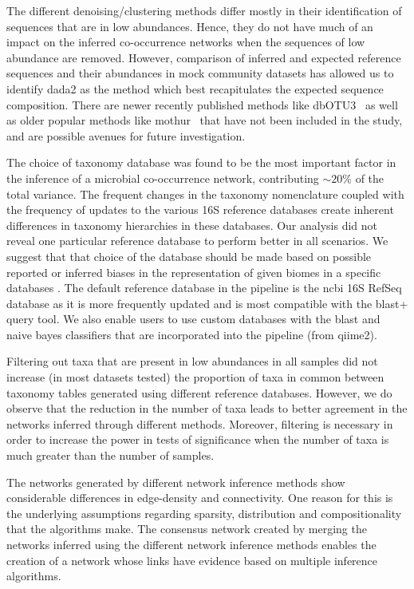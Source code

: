 The different denoising/clustering methods differ mostly in their identification of sequences that are in low abundances.
Hence, they do not have much of an impact on the inferred co-occurrence networks when the sequences of low abundance are removed.
However, comparison of inferred and expected reference sequences and their abundances in mock community datasets has allowed us to identify \ac{dada2} as the method which best recapitulates the expected sequence composition.
There are newer recently published methods like dbOTU3~\cite{Olesen2017} as well as older popular methods like mothur~\cite{Schloss2009} that have not been included in the study, and are possible avenues for future investigation.

The choice of taxonomy database was found to be the most important factor in the inference of a microbial co-occurrence network, contributing $\sim20\%$ of the total variance.
The frequent changes in the taxonomy nomenclature coupled with the frequency of updates to the various 16S reference databases create inherent differences \cite{Balvociute2017} in taxonomy hierarchies in these databases.
Our analysis did not reveal one particular reference database to perform better in all scenarios. We suggest that that choice of the database should be made based on possible reported or inferred biases in the representation of given biomes in a specific databases \cite{Balvociute2017}.
The default reference database in the pipeline is the \ac{ncbi} 16S RefSeq database as it is more frequently updated and is most compatible with the blast+ query tool.
We also enable users to use custom databases \cite{Griffen2011,Ritari2015} with the blast and naive bayes classifiers that are incorporated into the pipeline (from \ac{qiime2}).

Filtering out taxa that are present in low abundances in all samples did not increase (in most datasets tested) the proportion of taxa in common between taxonomy tables generated using different reference databases.
However, we do observe that the reduction in the number of taxa leads to better agreement in the networks inferred through different methods.
Moreover, filtering is necessary in order to increase the power in tests of significance when the number of taxa is much greater than the number of samples.

The networks generated by different network inference methods show considerable differences in edge-density and connectivity.
One reason for this is the underlying assumptions regarding sparsity, distribution and compositionality that the algorithms make.
The consensus network created by merging the networks inferred using the different network inference methods enables the creation of a network whose links have evidence based on multiple inference algorithms.

